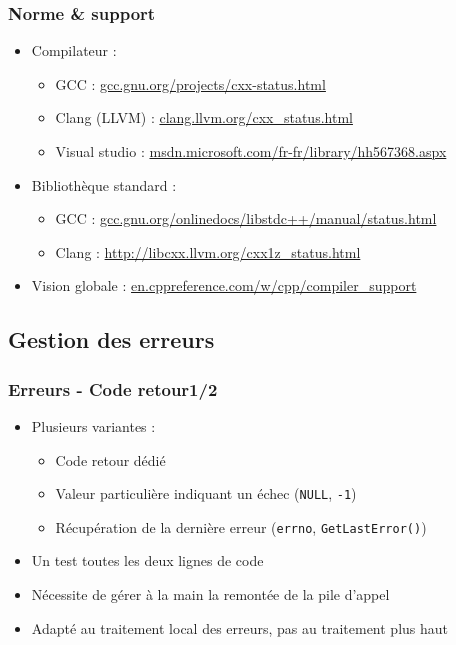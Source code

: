 \documentclass[C++.tex]{subfiles}
\begin{document}
\begin{frame}
	\frametitle{Norme \& support}
	\begin{itemize}
		\item Compilateur :
		\begin{itemize}
			\item GCC : \href{https://gcc.gnu.org/projects/cxx-status.html}{gcc.gnu.org/projects/cxx-status.html}
			\item Clang (LLVM) : \href{http://clang.llvm.org/cxx_status.html}{clang.llvm.org/cxx\_status.html}
			\item Visual studio : \href{https://msdn.microsoft.com/fr-fr/library/hh567368.aspx}{msdn.microsoft.com/fr-fr/library/hh567368.aspx}
		\end{itemize}
		\item Bibliothèque standard :
		\begin{itemize}
			\item GCC : \href{https://gcc.gnu.org/onlinedocs/libstdc++/manual/status.html}{gcc.gnu.org/onlinedocs/libstdc++/manual/status.html}
			\item Clang : \url{http://libcxx.llvm.org/cxx1z_status.html}
		\end{itemize}
		\item Vision globale : \href{http://en.cppreference.com/w/cpp/compiler_support}{en.cppreference.com/w/cpp/compiler\_support}
	\end{itemize}
\end{frame}

\subsection*{Gestion des erreurs}
\begin{frame}
	\frametitle{Erreurs - Code retour\titlehfill{}1/2}


	\begin{itemize}
		\item Plusieurs variantes :
		\begin{itemize}
			\item Code retour dédié
			\item Valeur particulière indiquant un échec (\lstinline|NULL|, \lstinline|-1|)
			\item Récupération de la dernière erreur (\lstinline|errno|, \lstinline|GetLastError()|)
		\end{itemize}
		\item \og Un test toutes les deux lignes de code\fg{}
		\item Nécessite de gérer \og à la main\fg{} la remontée de la pile d'appel
		\item Adapté au traitement local des erreurs, pas au traitement \og plus haut\fg{}
	\end{itemize}
\end{frame}
\end{document}
